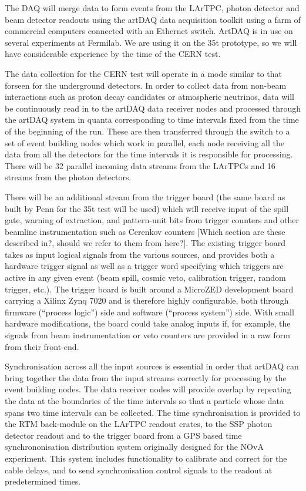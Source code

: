 The DAQ will merge data to form events from the LArTPC, 
photon detector and beam detector readouts using the 
artDAQ data acquisition toolkit using a farm of commercial 
computers connected with an Ethernet switch.  ArtDAQ is 
in use on several experiments at Fermilab.  We are using it
on the 35t prototype, so we will have considerable 
experience by the time of the CERN test.  

The data collection for the CERN test will operate in a mode 
similar to that forseen for the underground detectors. In order 
to collect data from non-beam interactions such as proton decay 
candidates or atmospheric neutrinos, data will be continuously
read in to the artDAQ data receiver nodes and processed through
the artDAQ system in quanta corresponding to time intervals fixed
from the time of the beginning of the run.  These are then 
transferred through the switch to a set of event building nodes 
which work in parallel, each node receiving all the data from all 
the detectors for the time intervals it is responsible for processing.
There will be 32 parallel incoming data streams from the LArTPCs
and 16 streams from the photon detectors.  

	There will be an additional stream from the trigger board (the same
board as built by Penn for the 35t test will be used) which will receive input
of the spill gate, warning of extraction, and pattern-unit bits from trigger
counters and other beamline instrumentation such as Cerenkov counters [Which
section are these described in?, should we refer to them from here?]. The
existing trigger board takes as input logical signals from the various sources,
and provides both a hardware trigger signal as well as a trigger word
specifying which triggers are active in any given event (beam spill, cosmic
veto, calibration trigger, random trigger, etc.).  The trigger board is built
around a MicroZED development board carrying a Xilinx Zynq 7020 and is
therefore highly configurable, both through firmware (``process logic'') side
and software (``process system'') side.  With small hardware modifications, the
board could take analog inputs if, for example, the signals from beam
instrumentation or veto counters are provided in a raw form from their
front-end.

Synchronisation across all the input sources is essential in order 
that artDAQ can bring together the data from the input streams correctly for
processing by the event building nodes.  The data receiver nodes will provide
overlap by repeating the data at the boundaries of the time intervals so 
that a particle whose data spans two time intervals can be collected.  
The time synchronisation is provided to the RTM back-module on the LArTPC 
readout crates, to the SSP photon detector readout and to the trigger board from
a GPS based time synchrononisation distribution system originally designed 
for the NOvA experiment.  This system includes functionality to calibrate and 
correct for the cable delays, and to send synchronisation control signals to
the readout at predetermined times.

